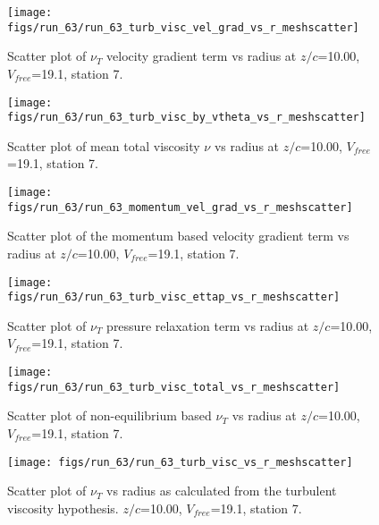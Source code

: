 \begin{figure}[H]
\centering
\texttt{[image: figs/run\_63/run\_63\_turb\_visc\_vel\_grad\_vs\_r\_meshscatter]}
\caption{Scatter plot of $\nu_T$ velocity gradient term vs radius at $z/c$=10.00, $V_{free}$=19.1, station 7.}
\end{figure}


\begin{figure}[H]
\centering
\texttt{[image: figs/run\_63/run\_63\_turb\_visc\_by\_vtheta\_vs\_r\_meshscatter]}
\caption{Scatter plot of mean total viscosity $\nu$ vs radius at $z/c$=10.00, $V_{free}$=19.1, station 7.}
\end{figure}


\begin{figure}[H]
\centering
\texttt{[image: figs/run\_63/run\_63\_momentum\_vel\_grad\_vs\_r\_meshscatter]}
\caption{Scatter plot of the momentum based velocity gradient term vs radius at $z/c$=10.00, $V_{free}$=19.1, station 7.}
\end{figure}


\begin{figure}[H]
\centering
\texttt{[image: figs/run\_63/run\_63\_turb\_visc\_ettap\_vs\_r\_meshscatter]}
\caption{Scatter plot of $\nu_T$ pressure relaxation term vs radius at $z/c$=10.00, $V_{free}$=19.1, station 7.}
\end{figure}


\begin{figure}[H]
\centering
\texttt{[image: figs/run\_63/run\_63\_turb\_visc\_total\_vs\_r\_meshscatter]}
\caption{Scatter plot of non-equilibrium based $\nu_T$ vs radius at $z/c$=10.00, $V_{free}$=19.1, station 7.}
\end{figure}


\begin{figure}[H]
\centering
\texttt{[image: figs/run\_63/run\_63\_turb\_visc\_vs\_r\_meshscatter]}
\caption{Scatter plot of $\nu_T$ vs radius as calculated from the turbulent viscosity hypothesis. $z/c$=10.00, $V_{free}$=19.1, station 7.}
\end{figure}


